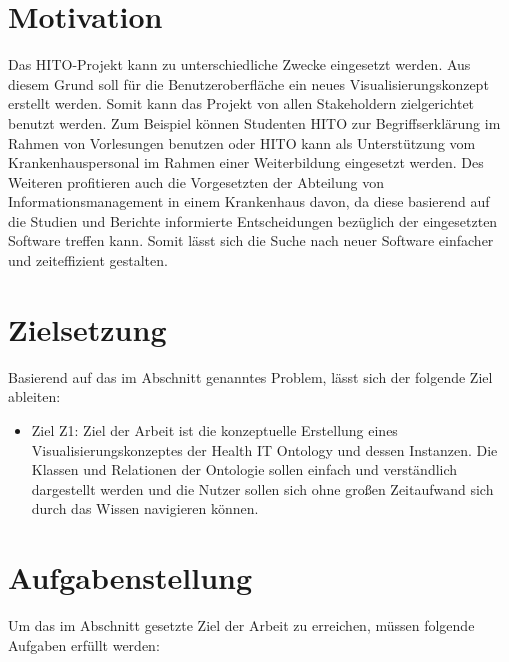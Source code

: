 \section{Motivation}\label{sec:motivation}

Das HITO-Projekt kann zu unterschiedliche Zwecke eingesetzt werden. Aus diesem Grund soll für die Benutzeroberfläche ein neues Visualisierungskonzept erstellt werden. Somit kann das Projekt von allen Stakeholdern zielgerichtet benutzt werden. Zum Beispiel können Studenten HITO zur Begriffserklärung im Rahmen von Vorlesungen benutzen oder HITO kann als Unterstützung vom Krankenhauspersonal im Rahmen einer Weiterbildung eingesetzt werden. Des Weiteren profitieren auch die Vorgesetzten der Abteilung von Informationsmanagement in einem Krankenhaus davon, da diese basierend auf die Studien und Berichte informierte Entscheidungen bezüglich der eingesetzten Software treffen kann. Somit lässt sich die Suche nach neuer Software einfacher und zeiteffizient gestalten.

\section{Zielsetzung}\label{sec:zielsetzung}

Basierend auf das im Abschnitt  genanntes Problem, lässt sich der folgende Ziel ableiten:

\begin{itemize}
\item Ziel Z1: Ziel der Arbeit ist die konzeptuelle Erstellung eines Visualisierungskonzeptes der Health IT Ontology und dessen Instanzen.
Die Klassen und Relationen der Ontologie sollen einfach und verständlich dargestellt werden und die Nutzer sollen sich ohne großen Zeitaufwand sich durch das Wissen navigieren können.
\end{itemize}

\section{Aufgabenstellung}\label{sec:aufgabenstellung}

Um das im Abschnitt  gesetzte Ziel der Arbeit zu erreichen, müssen folgende Aufgaben erfüllt werden:

